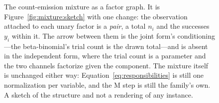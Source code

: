 \begin{figure}[htbp]
\centering
{}
\caption{The count-emission mixture as a factor graph. It is
Figure~\ref{fig:mixture:sketch} with one change: the observation attached to
each unary factor is a \emph{pair}, a total $n_i$ and the successes $y_i$
within it. The arrow between them is the joint form's conditioning---the
beta-binomial's trial count is the drawn total---and is absent in the
independent form, where the trial count is a parameter and the two channels
factorize given the component. The mixture itself is unchanged either way:
Equation~\ref{eq:responsibilities} is still one normalization per variable,
and the M step is still the family's own. A sketch of the structure and not a
rendering of any instance.}
\label{fig:emissionmixture:sketch}
\end{figure}

